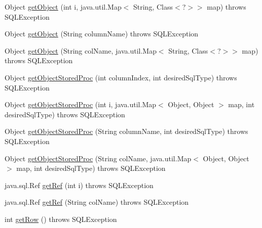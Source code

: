 \begin{DoxyCompactItemize}
\item 
Object \mbox{\hyperlink{classcom_1_1mysql_1_1cj_1_1jdbc_1_1result_1_1_result_set_impl_a74095e4f567e73fa09feaba8b1d62d53}{get\+Object}} (int i, java.\+util.\+Map$<$ String, Class$<$?$>$$>$ map)  throws S\+Q\+L\+Exception 
\item 
Object \mbox{\hyperlink{classcom_1_1mysql_1_1cj_1_1jdbc_1_1result_1_1_result_set_impl_a4a151a623173f8c8eaef246cb78745d1}{get\+Object}} (String column\+Name)  throws S\+Q\+L\+Exception 
\item 
Object \mbox{\hyperlink{classcom_1_1mysql_1_1cj_1_1jdbc_1_1result_1_1_result_set_impl_ac353de011fc57fa9723d09343a2716be}{get\+Object}} (String col\+Name, java.\+util.\+Map$<$ String, Class$<$?$>$$>$ map)  throws S\+Q\+L\+Exception 
\item 
Object \mbox{\hyperlink{classcom_1_1mysql_1_1cj_1_1jdbc_1_1result_1_1_result_set_impl_a3dfdc0ed2f2b5498834ffbf5a0269e1a}{get\+Object\+Stored\+Proc}} (int column\+Index, int desired\+Sql\+Type)  throws S\+Q\+L\+Exception 
\item 
Object \mbox{\hyperlink{classcom_1_1mysql_1_1cj_1_1jdbc_1_1result_1_1_result_set_impl_a70dfce90a5b666ec4699ca1b91a7a713}{get\+Object\+Stored\+Proc}} (int i, java.\+util.\+Map$<$ Object, Object $>$ map, int desired\+Sql\+Type)  throws S\+Q\+L\+Exception 
\item 
Object \mbox{\hyperlink{classcom_1_1mysql_1_1cj_1_1jdbc_1_1result_1_1_result_set_impl_a8e01634eee20129d559ee3ccfa59b24f}{get\+Object\+Stored\+Proc}} (String column\+Name, int desired\+Sql\+Type)  throws S\+Q\+L\+Exception 
\item 
Object \mbox{\hyperlink{classcom_1_1mysql_1_1cj_1_1jdbc_1_1result_1_1_result_set_impl_aa9d0a1c264c70954b3fbc1f81f0e7a9b}{get\+Object\+Stored\+Proc}} (String col\+Name, java.\+util.\+Map$<$ Object, Object $>$ map, int desired\+Sql\+Type)  throws S\+Q\+L\+Exception 
\item 
java.\+sql.\+Ref \mbox{\hyperlink{classcom_1_1mysql_1_1cj_1_1jdbc_1_1result_1_1_result_set_impl_a861229b18588fc13fa9e7996666c2afc}{get\+Ref}} (int i)  throws S\+Q\+L\+Exception 
\item 
java.\+sql.\+Ref \mbox{\hyperlink{classcom_1_1mysql_1_1cj_1_1jdbc_1_1result_1_1_result_set_impl_a4311c8f11b6fdf58d57ff04a75955643}{get\+Ref}} (String col\+Name)  throws S\+Q\+L\+Exception 
\item 
int \mbox{\hyperlink{classcom_1_1mysql_1_1cj_1_1jdbc_1_1result_1_1_result_set_impl_a8615a7c1bc1a80dc5aa47b0990fa07e2}{get\+Row}} ()  throws S\+Q\+L\+Exception 
\item 

\end{DoxyCompactItemize}
